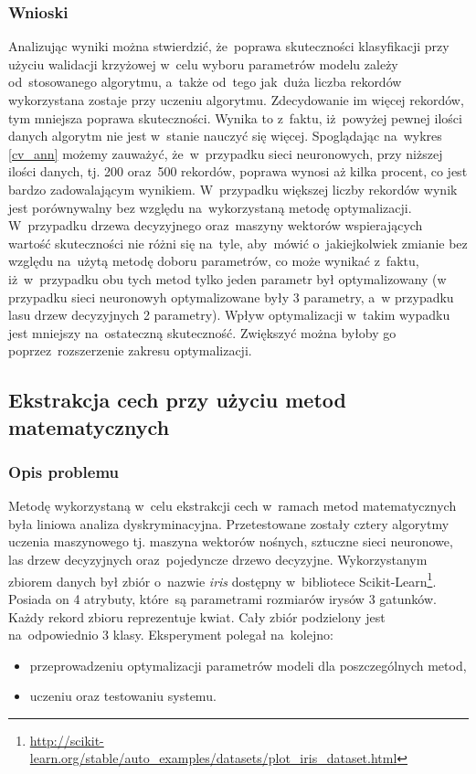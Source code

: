 \subsubsection{Wnioski}
Analizując wyniki można stwierdzić, że~poprawa skuteczności klasyfikacji przy użyciu walidacji krzyżowej w~celu wyboru parametrów modelu zależy od~stosowanego algorytmu, a~także od~tego jak~duża liczba rekordów wykorzystana zostaje przy uczeniu algorytmu. Zdecydowanie im więcej rekordów, tym mniejsza poprawa skuteczności. Wynika to z~faktu, iż~powyżej pewnej ilości danych algorytm nie jest w~stanie nauczyć się więcej. Spoglądając na~wykres \ref{cv_ann} możemy zauważyć, że~w~przypadku sieci neuronowych, przy niższej ilości danych, tj. 200 oraz~500 rekordów, poprawa wynosi aż kilka procent, co jest bardzo zadowalającym wynikiem. W~przypadku większej liczby rekordów wynik jest porównywalny bez względu na~wykorzystaną metodę optymalizacji. W~przypadku drzewa decyzyjnego oraz~maszyny wektorów wspierających wartość skuteczności nie różni się na~tyle, aby~mówić o~jakiejkolwiek zmianie bez względu na~użytą metodę doboru parametrów, co może wynikać z~faktu, iż~w~przypadku obu tych metod tylko jeden parametr był optymalizowany (w przypadku sieci neuronowyh optymalizowane były 3 parametry, a~w przypadku lasu drzew decyzyjnych 2 parametry). Wpływ optymalizacji w~takim wypadku jest mniejszy na~ostateczną skuteczność. Zwiększyć można byłoby go poprzez~rozszerzenie zakresu optymalizacji.

\subsection{Ekstrakcja cech przy użyciu metod matematycznych}

\subsubsection{Opis problemu}
Metodę wykorzystaną w~celu ekstrakcji cech w~ramach metod matematycznych była liniowa analiza dyskryminacyjna. Przetestowane zostały cztery algorytmy uczenia maszynowego tj. maszyna wektorów nośnych, sztuczne sieci neuronowe, las drzew decyzyjnych oraz~pojedyncze drzewo decyzyjne. Wykorzystanym zbiorem danych był zbiór o~nazwie \textit{iris} dostępny w~bibliotece Scikit-Learn\footnote{\url{http://scikit-learn.org/stable/auto_examples/datasets/plot_iris_dataset.html}}. Posiada on 4 atrybuty, które~są parametrami rozmiarów irysów 3 gatunków. Każdy rekord zbioru reprezentuje kwiat. Cały zbiór podzielony jest na~odpowiednio 3 klasy. Eksperyment polegał na~kolejno:
\begin{itemize}

\item przeprowadzeniu optymalizacji parametrów modeli dla poszczególnych metod,
\item uczeniu oraz testowaniu systemu.

\end{itemize}

